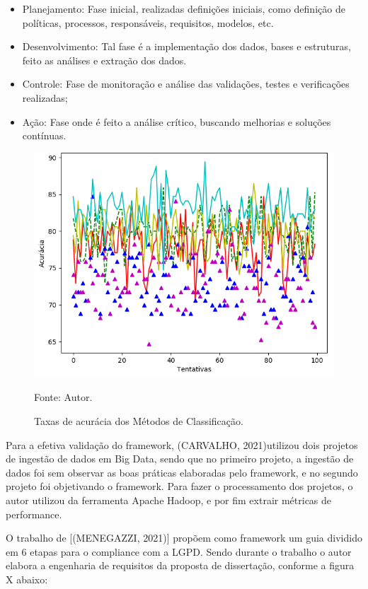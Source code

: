 \documentclass[
	12pt,				%
	openright,			%
	oneside,			%
	a4paper,			%
	english,			%
	french,				%
	spanish,			%
	brazil,				%
	]{abntex2}
\begin{document}
\begin{itemize}
\item Planejamento: Fase inicial, realizadas definições iniciais, como definição de políticas, processos, responsáveis, requisitos, modelos, etc.
\item Desenvolvimento: Tal fase é a implementação dos dados, bases e estruturas, feito as análises e extração dos dados.
\item Controle: Fase de monitoração e análise das validações, testes e verificações realizadas;
\item Ação: Fase onde é feito a análise crítico, buscando melhorias e soluções contínuas.
\end{itemize}

\begin{figure}[ht]
    \centering
    \caption{Taxas de acurácia dos Métodos de Classificação.}
    \includegraphics[width=5.0in]{Images/acc-classification.png}
    \label{fig: grafico-acc}
    
    \centering \small Fonte: Autor.
\end{figure}

Para a efetiva validação do framework, (CARVALHO, 2021)utilizou dois projetos de ingestão de dados em Big Data, sendo que no primeiro projeto, a ingestão de dados foi sem observar as boas práticas elaboradas pelo framework, e no segundo projeto foi objetivando o framework. Para fazer o processamento dos projetos, o autor utilizou da ferramenta Apache Hadoop, e por fim extrair métricas de performance.

O trabalho de [(MENEGAZZI, 2021)] propõem como framework um guia dividido em 6 etapas para o compliance com a LGPD. Sendo durante o trabalho o autor elabora a engenharia de requisitos da proposta de dissertação, conforme a figura X abaixo: 
\end{document}
